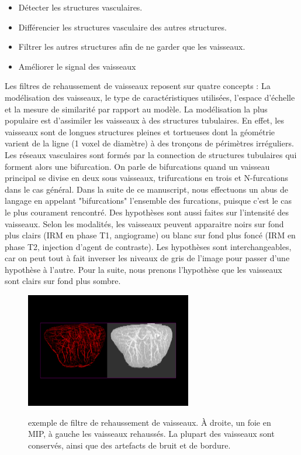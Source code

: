   \begin{itemize}
  \item Détecter les structures vasculaires.
  \item Différencier les structures vasculaire des autres structures.
  \item Filtrer les autres structures afin de ne garder que les vaisseaux.
  \item Améliorer le signal des vaisseaux
  \end{itemize}

Les filtres de rehaussement de vaisseaux reposent sur quatre concepts : La modélisation des vaisseaux, le type de caractéristiques utilisées, l'espace d'échelle et la mesure de similarité par rapport au modèle. La modélisation la plus populaire est d'assimiler les vaisseaux à des structures tubulaires. En effet, les vaisseaux sont de longues structures pleines et tortueuses dont la géométrie varient de la ligne (1 voxel de diamètre) à des tronçons de périmètres irréguliers. Les réseaux vasculaires sont formés par la connection de structures tubulaires qui forment alors une bifurcation. On parle de  bifurcations quand un vaisseau principal se divise en deux sous vaisseaux, trifurcations en trois et N-furcations dans le cas général. Dans la suite de ce manuscript, nous effectuons un abus de langage en appelant "bifurcations" l'ensemble des furcations, puisque c'est le cas le plus courament rencontré. Des hypothèses sont aussi faites sur l'intensité des vaisseaux. Selon les modalités, les vaisseaux peuvent apparaitre noirs sur fond plus clairs (IRM en phase T1, angiograme) ou blanc sur fond plus foncé (IRM en phase T2, injection d'agent de contraste). Les hypothèses sont interchangeables, car on peut tout à fait inverser les niveaux de gris de l'image pour passer d'une hypothèse à l'autre. Pour la suite, nous prenons l'hypothèse que les vaisseaux sont clairs sur fond plus sombre.

\begin{figure}[h]
  \centering
  \includegraphics[height=5cm]{Images/vessels_enhancement.png}
  \label{fig:exemple_vesselness}
  \caption{exemple de filtre de rehaussement de vaisseaux. À droite, un foie en MIP, à gauche les vaisseaux rehaussés. La plupart des vaisseaux sont conservés, ainsi que des artefacts de bruit et de bordure. }
\end{figure}

